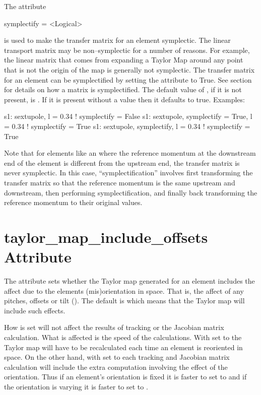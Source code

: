 The  attribute
\begin{example}
  symplectify = <Logical>
\end{example}
is used to make the transfer matrix for an element symplectic. The linear transport matrix may be
non--symplectic for a number of reasons.  For example, the linear matrix that comes from expanding a
Taylor Map around any point that is not the origin of the map is generally not symplectic. The
transfer matrix for an element can be symplectified by setting the  attribute to
True. See section~ for details on how a matrix is symplectified. The default
value of , if it is not present, is . If it is present without a value
then it defaults to true. Examples:
\begin{example}
  s1: sextupole, l = 0.34                       ! symplectify = False
  s1: sextupole, symplectify = True, l = 0.34   ! symplectify = True
  s1: sextupole, symplectify, l = 0.34          ! symplectify = True
\end{example}

\label{lcavity} Note that for elements like an  where the
reference momentum at the downstream end of the element is different
from the upstream end, the transfer matrix is never symplectic. In
this case, ``symplectification'' involves first transforming the
transfer matrix so that the reference momentum is the same upstream
and downstream, then performing symplectification, and finally back
transforming the reference momentum to their original values.

\section{taylor_map_include_offsets Attribute}
\label{s:mapoff}

The  attribute sets whether the Taylor map
generated for an element includes the affect due to the elements
(mis)orientation in space. That is, the affect of any pitches, offsets
or tilt (). The default is  which means that
the Taylor map will include such effects. 

How  is set will not affect the results of
tracking or the Jacobian matrix calculation. What is affected is the
speed of the calculations. With  set to 
the Taylor map will have to be recalculated each time an element is
reoriented in space. On the other hand, with  set
to  each tracking and Jacobian matrix calculation will
include the extra computation involving the effect of the
orientation. Thus if an element's orientation is fixed it is faster to
set  to  and if the orientation is
varying it is faster to set  to .

